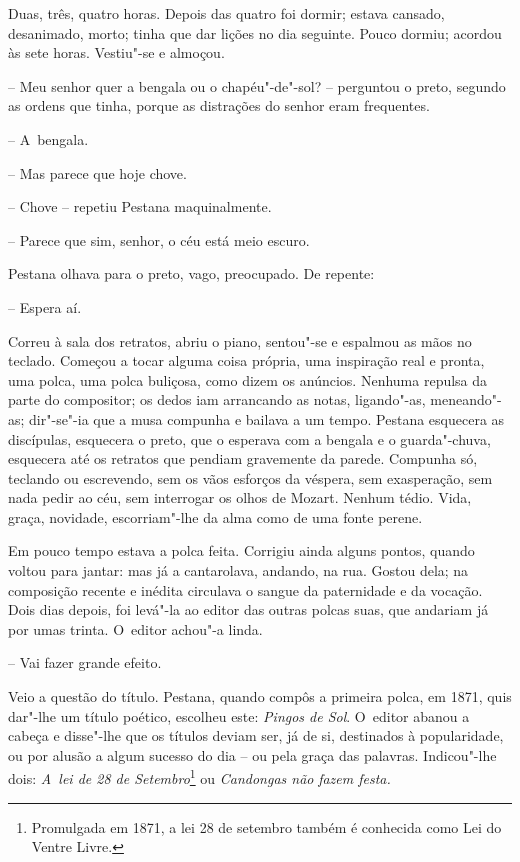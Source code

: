 Duas, três, quatro horas. Depois das quatro foi dormir; estava cansado,
desanimado, morto; tinha que dar lições no dia seguinte. Pouco dormiu;
acordou às sete horas. Vestiu"-se e almoçou.

-- Meu senhor quer a bengala ou o chapéu"-de"-sol? -- perguntou o preto,
segundo as ordens que tinha, porque as distrações do senhor eram
frequentes.

-- A~bengala.

-- Mas parece que hoje chove.

-- Chove -- repetiu Pestana maquinalmente.

-- Parece que sim, senhor, o céu está meio escuro.

Pestana olhava para o preto, vago, preocupado. De repente:

-- Espera aí.

Correu à sala dos retratos, abriu o piano, sentou"-se e espalmou as mãos
no teclado. Começou a tocar alguma coisa própria, uma inspiração real e
pronta, uma polca, uma polca buliçosa, como dizem os anúncios. Nenhuma
repulsa da parte do compositor; os dedos iam arrancando as notas,
ligando"-as, meneando"-as; dir"-se"-ia que a musa compunha e bailava a um
tempo. Pestana esquecera as discípulas, esquecera o preto, que o
esperava com a bengala e o guarda"-chuva, esquecera até os retratos que
pendiam gravemente da parede. Compunha só, teclando ou escrevendo, sem
os vãos esforços da véspera, sem exasperação, sem nada pedir ao céu, sem
interrogar os olhos de Mozart. Nenhum tédio. Vida, graça, novidade,
escorriam"-lhe da alma como de uma fonte perene.

Em pouco tempo estava a polca feita. Corrigiu ainda alguns pontos,
quando voltou para jantar: mas já a cantarolava, andando, na rua. Gostou
dela; na composição recente e inédita circulava o sangue da paternidade
e da vocação. Dois dias depois, foi levá"-la ao editor das outras polcas
suas, que andariam já por umas trinta. O~editor achou"-a linda.

-- Vai fazer grande efeito.

Veio a questão do título. Pestana, quando compôs a primeira polca, em
1871, quis dar"-lhe um título poético, escolheu este: \emph{Pingos de
Sol}. O~editor abanou a cabeça e disse"-lhe que os títulos deviam ser, já
de si, destinados à popularidade, ou por alusão a algum sucesso do dia
-- ou pela graça das palavras. Indicou"-lhe dois: \emph{A~lei de 28 de
Setembro}\footnote{Promulgada em 1871, a lei 28 de setembro também é
  conhecida como Lei do Ventre Livre.} ou \emph{Candongas não}
\emph{fazem festa.}

